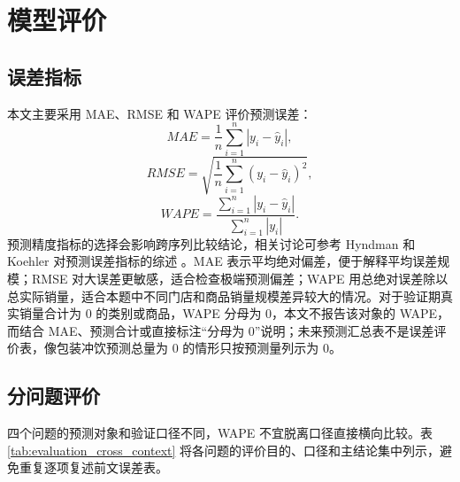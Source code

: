 \section{模型评价}

\subsection{误差指标}

本文主要采用 MAE、RMSE 和 WAPE 评价预测误差：
\begin{equation}
MAE=\frac{1}{n}\sum_{i=1}^{n}|y_i-\hat y_i|,
\end{equation}
\begin{equation}
RMSE=\sqrt{\frac{1}{n}\sum_{i=1}^{n}(y_i-\hat y_i)^2},
\end{equation}
\begin{equation}
WAPE=\frac{\sum_{i=1}^{n}|y_i-\hat y_i|}{\sum_{i=1}^{n}|y_i|}.
\end{equation}
预测精度指标的选择会影响跨序列比较结论，相关讨论可参考 Hyndman 和 Koehler 对预测误差指标的综述 \cite{hyndman2006accuracy}。MAE 表示平均绝对偏差，便于解释平均误差规模；RMSE 对大误差更敏感，适合检查极端预测偏差；WAPE 用总绝对误差除以总实际销量，适合本题中不同门店和商品销量规模差异较大的情况。对于验证期真实销量合计为 0 的类别或商品，WAPE 分母为 0，本文不报告该对象的 WAPE，而结合 MAE、预测合计或直接标注“分母为 0”说明；未来预测汇总表不是误差评价表，像包装冲饮预测总量为 0 的情形只按预测量列示为 0。

\subsection{分问题评价}

四个问题的预测对象和验证口径不同，WAPE 不宜脱离口径直接横向比较。表 \ref{tab:evaluation_cross_context} 将各问题的评价目的、口径和主结论集中列示，避免重复逐项复述前文误差表。

\begin{table}[H]
\centering
\caption{分问题评价口径与主结论}
\label{tab:evaluation_cross_context}
\end{table}


